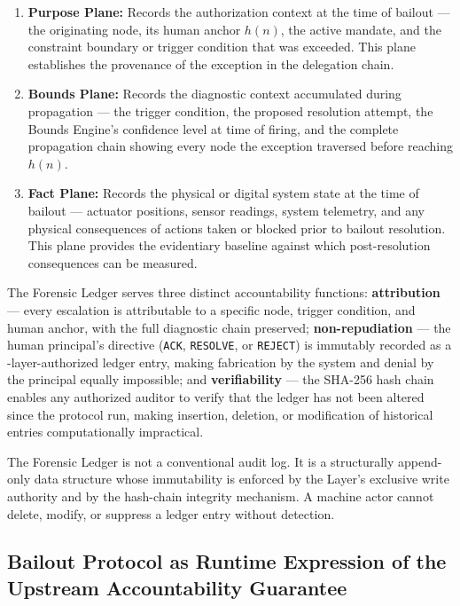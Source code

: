 \begin{enumerate}\itemsep=0pt
\item \textbf{Purpose Plane:} Records the authorization context at the time of bailout --- the originating node, its human anchor $h(n)$, the active mandate, and the constraint boundary or trigger condition that was exceeded. This plane establishes the provenance of the exception in the delegation chain.

\item \textbf{Bounds Plane:} Records the diagnostic context accumulated during propagation --- the trigger condition, the proposed resolution attempt, the Bounds Engine's confidence level at time of firing, and the complete propagation chain showing every node the exception traversed before reaching $h(n)$.

\item \textbf{Fact Plane:} Records the physical or digital system state at the time of bailout --- actuator positions, sensor readings, system telemetry, and any physical consequences of actions taken or blocked prior to bailout resolution. This plane provides the evidentiary baseline against which post-resolution consequences can be measured.
\end{enumerate}

The Forensic Ledger serves three distinct accountability functions: \textbf{attribution} --- every escalation is attributable to a specific node, trigger condition, and human anchor, with the full diagnostic chain preserved; \textbf{non-repudiation} --- the human principal's directive (\texttt{ACK}, \texttt{RESOLVE}, or \texttt{REJECT}) is immutably recorded as a \purpose{}-layer-authorized ledger entry, making fabrication by the system and denial by the principal equally impossible; and \textbf{verifiability} --- the SHA-256 hash chain enables any authorized auditor to verify that the ledger has not been altered since the protocol run, making insertion, deletion, or modification of historical entries computationally impractical.

The Forensic Ledger is not a conventional audit log. It is a structurally append-only data structure whose immutability is enforced by the \fact{} Layer's exclusive write authority and by the hash-chain integrity mechanism. A machine actor cannot delete, modify, or suppress a ledger entry without detection.

\subsection{Bailout Protocol as Runtime Expression of the Upstream Accountability Guarantee}\label{sec:bailout-uag}

